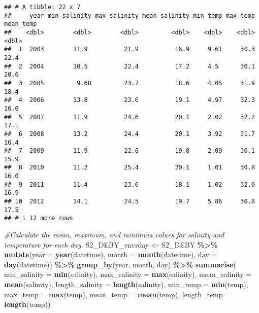 \documentclass[
]{article}
\newenvironment{Shaded}{\begin{snugshade}}{\end{snugshade}}
\newcommand{\AttributeTok}[1]{\textcolor[rgb]{0.13,0.29,0.53}{#1}}
\newcommand{\CommentTok}[1]{\textcolor[rgb]{0.56,0.35,0.01}{\textit{#1}}}
\newcommand{\FunctionTok}[1]{\textcolor[rgb]{0.13,0.29,0.53}{\textbf{#1}}}
\newcommand{\NormalTok}[1]{#1}
\newcommand{\OtherTok}[1]{\textcolor[rgb]{0.56,0.35,0.01}{#1}}
\newcommand{\SpecialCharTok}[1]{\textcolor[rgb]{0.81,0.36,0.00}{\textbf{#1}}}
\begin{document}
\begin{verbatim}
## # A tibble: 22 x 7
##     year min_salinity max_salinity mean_salinity min_temp max_temp mean_temp
##    <dbl>        <dbl>        <dbl>         <dbl>    <dbl>    <dbl>     <dbl>
##  1  2003        11.9          21.9          16.9     9.61     30.3      22.4
##  2  2004        10.5          22.4          17.2     4.5      30.1      20.6
##  3  2005         9.68         23.7          18.6     4.05     31.9      18.4
##  4  2006        13.8          23.6          19.1     4.97     32.3      16.0
##  5  2007        11.9          24.6          20.1     2.02     32.2      17.1
##  6  2008        13.2          24.4          20.1     3.92     31.7      16.4
##  7  2009        11.9          22.6          19.8     2.09     30.1      15.9
##  8  2010        11.2          25.4          20.1     1.01     30.8      16.0
##  9  2011        11.4          23.6          18.1     1.02     32.0      16.9
## 10  2012        14.1          24.5          19.7     5.86     30.8      17.5
## # i 12 more rows
\end{verbatim}

\begin{Shaded}
\begin{Highlighting}[]
\CommentTok{\#Calculate the mean, maximum, and minimum values for salinity and temperature for each day. }
\NormalTok{S2\_DEBY\_envrday }\OtherTok{\textless{}{-}}\NormalTok{ S2\_DEBY }\SpecialCharTok{\%\textgreater{}\%}
    \FunctionTok{mutate}\NormalTok{(}\AttributeTok{year =} \FunctionTok{year}\NormalTok{(datetime), }\AttributeTok{month =} \FunctionTok{month}\NormalTok{(datetime), }\AttributeTok{day =} \FunctionTok{day}\NormalTok{(datetime)) }\SpecialCharTok{\%\textgreater{}\%}
    \FunctionTok{group\_by}\NormalTok{(year, month, day) }\SpecialCharTok{\%\textgreater{}\%}
    \FunctionTok{summarise}\NormalTok{(}
      \AttributeTok{min\_salinity =} \FunctionTok{min}\NormalTok{(salinity),}
      \AttributeTok{max\_salinity =} \FunctionTok{max}\NormalTok{(salinity),}
      \AttributeTok{mean\_salinity =} \FunctionTok{mean}\NormalTok{(salinity),}
      \AttributeTok{length\_salinity =} \FunctionTok{length}\NormalTok{(salinity),}
      \AttributeTok{min\_temp =} \FunctionTok{min}\NormalTok{(temp),}
      \AttributeTok{max\_temp =} \FunctionTok{max}\NormalTok{(temp),}
      \AttributeTok{mean\_temp =} \FunctionTok{mean}\NormalTok{(temp),}
      \AttributeTok{length\_temp =} \FunctionTok{length}\NormalTok{(temp))}
\end{Highlighting}
\end{Shaded}
\end{document}
